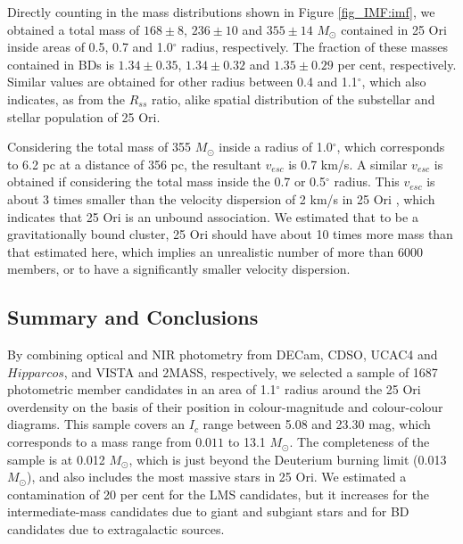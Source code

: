 \documentclass[12pt]{article}
\begin{document}
Directly counting in the mass distributions shown in Figure \ref{fig_IMF:imf}, we obtained a total mass of $168\pm8$, $236\pm10$ and $355\pm14$ $M_\odot$ contained in 25 Ori inside areas of 0.5, 0.7 and 1.0$^\circ$ radius, respectively. The fraction of these masses contained in BDs is $1.34\pm0.35$, $1.34\pm0.32$ and $1.35\pm0.29$ per cent, respectively. Similar values are obtained for other radius between 0.4 and 1.1$^\circ$, which also indicates, as from the $R_{ss}$ ratio, alike spatial distribution of the substellar and stellar population of 25 Ori.

Considering the total mass of 355 $M_\odot$ inside a radius of 1.0$^\circ$, which corresponds to 6.2 pc at a distance of 356 pc, the resultant $v_{esc}$ is 0.7 km/s. A similar $v_{esc}$ is obtained if considering the total mass inside the 0.7 or 0.5$^\circ$ radius. This $v_{esc}$ is about 3 times smaller than the velocity dispersion of 2 km/s in 25 Ori \citep{Briceno2007}, which indicates that 25 Ori is an unbound association. 
We estimated that to be a gravitationally bound cluster, 25 Ori should have about 10 times more mass than that estimated here, which implies an unrealistic number of more than 6000 members, or to have a significantly smaller velocity dispersion.

\subsection{Summary and Conclusions}
\label{sec_IMF:conclusions}

By combining optical and NIR photometry from DECam, CDSO, UCAC4 and $Hipparcos$, and VISTA and 2MASS, respectively, we selected a sample of 1687 photometric member candidates in an area of 1.1$^\circ$ radius around the 25 Ori overdensity on the basis of their position in colour-magnitude and colour-colour diagrams. This sample covers an $I_c$ range between 5.08 and 23.30 mag, which corresponds to a mass range from $0.011$ to 13.1 $M_\odot$. The completeness of the sample is at 0.012 $M_\odot$, which is just beyond the Deuterium burning limit (0.013 $M_\odot$), and also  includes the most massive stars in 25 Ori. We estimated a contamination of 20 per cent for the LMS candidates, but it increases for the intermediate-mass candidates due to giant and subgiant stars and for BD candidates due to extragalactic sources.
\end{document}
